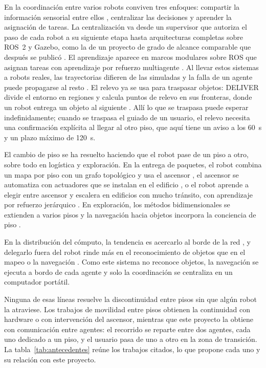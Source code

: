En la coordinación entre varios robots conviven tres enfoques: compartir la información sensorial entre ellos \autocite{nair2024collaborative}, centralizar las decisiones y aprender la asignación de tareas. La centralización va desde un supervisor que autoriza el paso de cada robot a su siguiente etapa \autocite{roszkowska2023multilevel} hasta arquitecturas completas sobre ROS~2 y Gazebo, como la de un proyecto de grado de alcance comparable \autocite{piguave2023multirobot} que después se publicó \autocite{yumbla2025open}. El aprendizaje aparece en marcos modulares sobre ROS que asignan tareas con aprendizaje por refuerzo multiagente \autocite{xu2026modular}. Al llevar estos sistemas a robots reales, las trayectorias difieren de las simuladas \autocite{rudrusamy2022broadcast} y la falla de un agente puede propagarse al resto \autocite{zhang2025kubernetes}. El relevo ya se usa para traspasar objetos: DELIVER divide el entorno en regiones y calcula puntos de relevo en sus fronteras, donde un robot entrega un objeto al siguiente \autocite{srivastava2026deliver}. Allí lo que se traspasa puede esperar indefinidamente; cuando se traspasa el guiado de un usuario, el relevo necesita una confirmación explícita al llegar al otro piso, que aquí tiene un aviso a los 60~s y un plazo máximo de 120~s.

El cambio de piso se ha resuelto haciendo que el robot pase de un piso a otro, sobre todo en logística y exploración. En la entrega de paquetes, el robot combina un mapa por piso con un grafo topológico y usa el ascensor \autocite{kim2024indoor}, el ascensor se automatiza con actuadores que se instalan en el edificio \autocite{song2024elevator}, o el robot aprende a elegir entre ascensor y escalera en edificios con mucho tránsito, con aprendizaje por refuerzo jerárquico \autocite{luo2025elevator}. En exploración, los métodos bidimensionales se extienden a varios pisos \autocite{chen2025lite} y la navegación hacia objetos incorpora la conciencia de piso \autocite{gong2026stairway}.

En la distribución del cómputo, la tendencia es acercarlo al borde de la red \autocite{tahir2025edge}, y delegarlo fuera del robot rinde más en el reconocimiento de objetos que en el mapeo o la navegación \autocite{dordevic2023offloading}. Como este sistema no reconoce objetos, la navegación se ejecuta a bordo de cada agente y solo la coordinación se centraliza en un computador portátil.

Ninguna de esas líneas resuelve la discontinuidad entre pisos sin que algún robot la atraviese. Los trabajos de movilidad entre pisos obtienen la continuidad con hardware o con intervención del ascensor, mientras que este proyecto la obtiene con comunicación entre agentes: el recorrido se reparte entre dos agentes, cada uno dedicado a un piso, y el usuario pasa de uno a otro en la zona de transición. La tabla~\ref{tab:antecedentes} reúne los trabajos citados, lo que propone cada uno y su relación con este proyecto.

